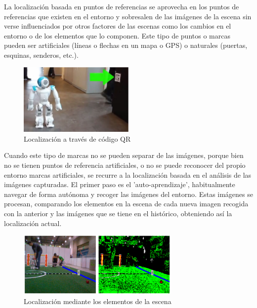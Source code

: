 La localización basada en puntos de referencias se aprovecha en los puntos de
referencias que existen en el entorno y sobresalen de las imágenes de la escena
sin verse influenciados por otros factores de las escenas como los cambios en el
entorno o de los elementos que lo componen. Este tipo de puntos o marcas pueden
ser artificiales (líneas o flechas en un mapa o GPS) o naturales (puertas,
esquinas, senderos, etc.).

\begin{figure}[!th]
  \begin{center}
    \includegraphics[width=0.5\textwidth]{images/cap2/LocalizacionMarcas.eps}
    \caption{Localización a través de código QR}
    \label{fig:LocalizacionMarcas}
  \end{center}
\end{figure}

Cuando este tipo de marcas no se pueden separar de las imágenes, porque bien no
se tienen puntos de referencia artificiales, o no se puede reconocer del propio
entorno marcas artificiales, se recurre a la localización basada en el análisis
de las imágenes capturadas. El primer paso es el 'auto-aprendizaje',
habitualmente navegar de forma autónoma y recoger las imágenes del entorno.
Estas imágenes se procesan, comparando los elementos en la escena de cada nueva
imagen recogida con la anterior y las imágenes que se tiene en el histórico,
obteniendo así la localización actual.

\begin{figure}[!th]
  \begin{center}
    \includegraphics[width=0.7\textwidth]{images/cap2/LocalizacionImagenes.eps}
    \caption{Localización mediante los elementos de la escena}
    \label{fig:LocalizacionImagenes}
  \end{center}
\end{figure}

